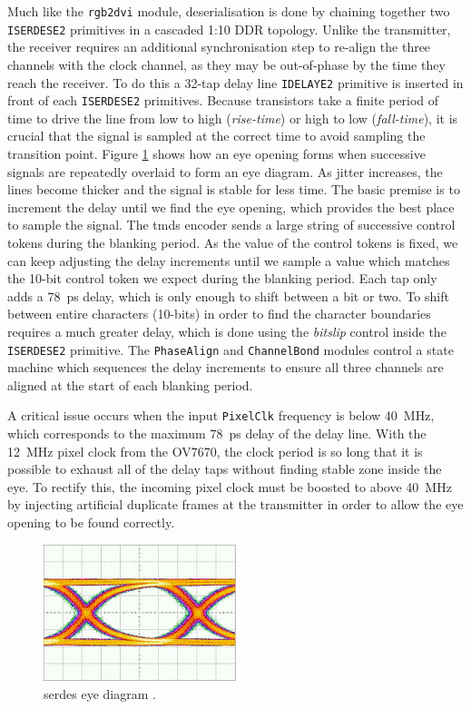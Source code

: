 Much like the \texttt{rgb2dvi} module, deserialisation is done by chaining together two \texttt{ISERDESE2} primitives in a cascaded 1:10 DDR topology. Unlike the transmitter, the receiver requires an additional synchronisation step to re-align the three channels with the clock channel, as they may be out-of-phase by the time they reach the receiver. To do this a 32-tap delay line \texttt{IDELAYE2} primitive is inserted in front of each \texttt{ISERDESE2} primitives. Because transistors take a finite period of time to drive the line from low to high (\textit{rise-time}) or high to low (\textit{fall-time}), it is crucial that the signal is sampled at the correct time to avoid sampling the transition point. Figure \ref{fig:eye_diagram} shows how an eye opening forms when successive signals are repeatedly overlaid to form an eye diagram. As jitter increases, the lines become thicker and the signal is stable for less time. The basic premise is to increment the delay until we find the eye opening, which provides the best place to sample the signal. The \gls{tmds} encoder sends a large string of successive control tokens during the blanking period. As the value of the control tokens is fixed, we can keep adjusting the delay increments until we sample a value which matches the 10-bit control token we expect during the blanking period. Each tap only adds a \SI{78}{\pico\second} delay, which is only enough to shift between a bit or two. To shift between entire characters (10-bits) in order to find the character boundaries requires a much greater delay, which is done using the \textit{bitslip} control inside the \texttt{ISERDESE2} primitive. The \texttt{PhaseAlign} and \texttt{ChannelBond} modules control a state machine which sequences the delay increments to ensure all three channels are aligned at the start of each blanking period.

A critical issue occurs when the input \texttt{PixelClk} frequency is below \SI{40}{\mega\hertz}, which corresponds to the maximum \SI{78}{\pico\second} delay of the delay line. With the \SI{12}{\mega\hertz} pixel clock from the OV7670, the clock period is so long that it is possible to exhaust all of the delay taps without finding stable zone inside the eye. To rectify this, the incoming pixel clock must be boosted to above \SI{40}{\mega\hertz} by injecting artificial duplicate frames at the transmitter in order to allow the eye opening to be found correctly.

\begin{figure}
  \centering
  \includegraphics[width=0.5\textwidth]{./img/eye_diagram.jpg}
  \caption{\gls{serdes} eye diagram \cite{eye_diagram}.}
  \label{fig:eye_diagram}
\end{figure}

